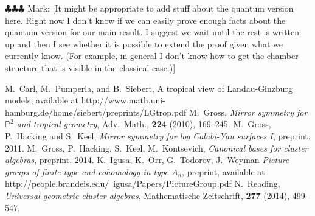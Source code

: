 \documentclass[12pt]{amsart}
\newcommand\markg[1]{{\color{red} \sf $\clubsuit\clubsuit\clubsuit$ Mark: [#1]}}
\theoremstyle{remark}
\begin{document}
\markg{It might be appropriate to add stuff about the quantum version here.
Right now I don't know if we can easily prove enough facts about the
quantum version for our main result. I suggest we wait until the rest
is written up and then I see whether it is possible to extend the proof
given what we currently know. (For example, in general I don't know how
to get the chamber structure that is visible in the classical case.)}



\begin{thebibliography}{99}
 M.~Carl, M.~Pumperla, and B.~Siebert,
A tropical view of Landau-Ginzburg models, available at
http://www.math.uni-hamburg.de/home/siebert/preprints/LGtrop.pdf
 M.~Gross,  \emph{Mirror symmetry for $\mathbb{P}^2$ 
and tropical geometry}, Adv.\ Math., {\bf 224} (2010), 169--245.
 M.~Gross, P.~Hacking and S.~Keel, \emph{Mirror
symmetry for log Calabi-Yau surfaces I}, preprint, 2011.
 M.~Gross, P.~Hacking, S.~Keel, M.~Kontsevich,
\emph{Canonical bases for cluster algebras}, preprint, 2014.
 K.~Igusa, K.~Orr, G.~Todorov, J.~Weyman \emph{Picture groups of finite type and cohomology in type $A_n$}, preprint, available at 
http://people.brandeis.edu/~igusa/Papers/PictureGroup.pdf
 N.~Reading, \emph{Universal geometric cluster algebras}, Mathematische Zeitschrift, {\bf 277 } (2014), 499-547.
\end{thebibliography}
\end{document}
